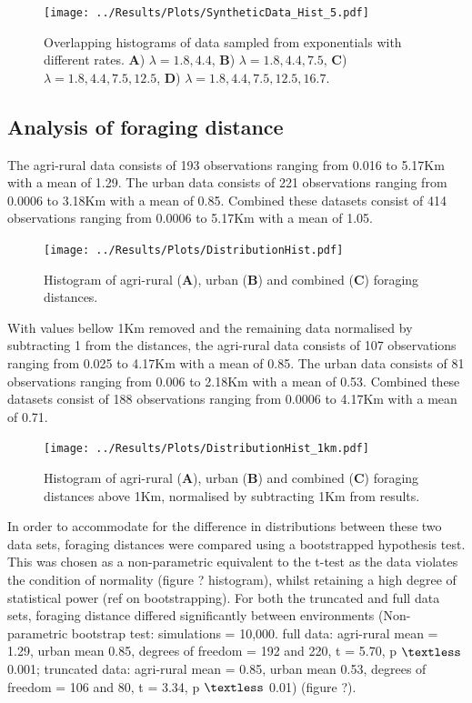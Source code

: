 \documentclass[11pt,usenames,dvipsnames]{article}
\begin{document}
\begin{figure}[H]
	\centering
	\texttt{[image: ../Results/Plots/SyntheticData\_Hist\_5.pdf]}
	\caption{Overlapping histograms of data sampled from exponentials with different rates. \textbf{A}) $\lambda = 1.8, 4.4$, \textbf{B}) $\lambda = 1.8, 4.4, 7.5$, \textbf{C}) $\lambda = 1.8, 4.4, 7.5, 12.5$, \textbf{D}) $\lambda = 1.8, 4.4, 7.5, 12.5, 16.7$.}
\end{figure}


\subsection{Analysis of foraging distance}

The agri-rural data consists of 193 observations ranging from 0.016 to 5.17Km with a mean of 1.29. The urban data consists of 221 observations ranging from 0.0006 to 3.18Km with a mean of 0.85. Combined these datasets consist of 414 observations ranging from 0.0006 to 5.17Km with a mean of 1.05.

\begin{figure}[H]
	\centering
	\texttt{[image: ../Results/Plots/DistributionHist.pdf]}
	\caption{Histogram of agri-rural (\textbf{A}), urban (\textbf{B}) and combined (\textbf{C}) foraging distances.}
\end{figure}

With values bellow 1Km removed and the remaining data normalised by subtracting 1 from the distances, the agri-rural data consists of 107 observations ranging from 0.025 to 4.17Km with a mean of 0.85. The urban data consists of 81 observations ranging from 0.006 to 2.18Km with a mean of 0.53. Combined these datasets consist of 188 observations ranging from 0.0006 to 4.17Km with a mean of 0.71.

\begin{figure}[H]
	\centering
	\texttt{[image: ../Results/Plots/DistributionHist\_1km.pdf]}
	\caption{Histogram of agri-rural (\textbf{A}), urban (\textbf{B}) and combined (\textbf{C}) foraging distances above 1Km, normalised by subtracting 1Km from results.}
\end{figure}

In order to accommodate for the difference in distributions between these two data sets, foraging distances were compared using a bootstrapped hypothesis test. This was chosen as a non-parametric equivalent to the t-test as the data violates the condition of normality (figure ? histogram), whilst retaining a high degree of statistical power (ref on bootstrapping). For both the truncated and full data sets, foraging distance differed significantly between environments (Non-parametric bootstrap test: simulations = 10,000. full data: agri-rural mean = 1.29, urban mean 0.85, degrees of freedom = 192 and 220, t = 5.70, p $\textless$ 0.001; truncated data: agri-rural mean = 0.85, urban mean 0.53, degrees of freedom = 106 and 80, t = 3.34, p $\textless$ 0.01) (figure ?). 
\end{document}
